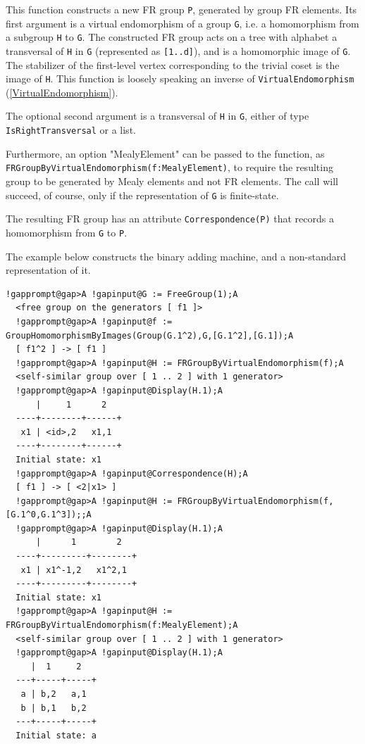 \documentclass[a4paper,11pt]{report}
\begin{document}
{{{ This function constructs a new FR group \texttt{P}, generated by group FR elements. Its first argument is a virtual endomorphism
of a group \texttt{G}, i.e. a homomorphism from a subgroup \texttt{H} to \texttt{G}. The constructed FR group acts on a tree with alphabet a transversal of \texttt{H} in \texttt{G} (represented as \texttt{[1..d]}), and is a homomorphic image of \texttt{G}. The stabilizer of the first-level vertex corresponding to the trivial coset
is the image of \texttt{H}. This function is loosely speaking an inverse of \texttt{VirtualEndomorphism} (\ref{VirtualEndomorphism}). 

 The optional second argument is a transversal of \texttt{H} in \texttt{G}, either of type \texttt{IsRightTransversal} or a list. 

 Furthermore, an option "MealyElement" can be passed to the function, as \texttt{FRGroupByVirtualEndomorphism(f:MealyElement)}, to require the resulting group to be generated by Mealy elements and not FR
elements. The call will succeed, of course, only if the representation of \texttt{G} is finite-state. 

 The resulting FR group has an attribute \texttt{Correspondence(P)} that records a homomorphism from \texttt{G} to \texttt{P}. 

 The example below constructs the binary adding machine, and a non-standard
representation of it. 
\begin{Verbatim}[commandchars=!@A,fontsize=\small,frame=single,label=Example]
  !gapprompt@gap>A !gapinput@G := FreeGroup(1);A
  <free group on the generators [ f1 ]>
  !gapprompt@gap>A !gapinput@f := GroupHomomorphismByImages(Group(G.1^2),G,[G.1^2],[G.1]);A
  [ f1^2 ] -> [ f1 ]
  !gapprompt@gap>A !gapinput@H := FRGroupByVirtualEndomorphism(f);A
  <self-similar group over [ 1 .. 2 ] with 1 generator>
  !gapprompt@gap>A !gapinput@Display(H.1);A
      |     1      2
  ----+--------+------+
   x1 | <id>,2   x1,1
  ----+--------+------+
  Initial state: x1
  !gapprompt@gap>A !gapinput@Correspondence(H);A
  [ f1 ] -> [ <2|x1> ]
  !gapprompt@gap>A !gapinput@H := FRGroupByVirtualEndomorphism(f,[G.1^0,G.1^3]);;A
  !gapprompt@gap>A !gapinput@Display(H.1);A
      |      1        2
  ----+---------+--------+
   x1 | x1^-1,2   x1^2,1
  ----+---------+--------+
  Initial state: x1
  !gapprompt@gap>A !gapinput@H := FRGroupByVirtualEndomorphism(f:MealyElement);A
  <self-similar group over [ 1 .. 2 ] with 1 generator>
  !gapprompt@gap>A !gapinput@Display(H.1);A
     |  1     2
  ---+-----+-----+
   a | b,2   a,1
   b | b,1   b,2
  ---+-----+-----+
  Initial state: a
\end{Verbatim}
 }

}}
\end{document}

